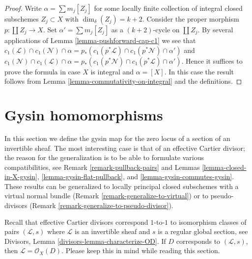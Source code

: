 \begin{proof}
Write $\alpha = \sum m_j[Z_j]$ for some locally finite
collection of integral closed subschemes $Z_j \subset X$
with $\dim_\delta(Z_j) = k + 2$.
Consider the proper morphism $p : \coprod Z_j \to X$.
Set $\alpha' = \sum m_j[Z_j]$ as a $(k + 2)$-cycle on
$\coprod Z_j$. By several applications of
Lemma \ref{lemma-pushforward-cap-c1} we see that
$c_1(\mathcal{L}) \cap c_1(\mathcal{N}) \cap \alpha
= p_*(c_1(p^*\mathcal{L}) \cap c_1(p^*\mathcal{N}) \cap \alpha')$
and
$c_1(\mathcal{N}) \cap c_1(\mathcal{L}) \cap \alpha
= p_*(c_1(p^*\mathcal{N}) \cap c_1(p^*\mathcal{L}) \cap \alpha')$.
Hence it suffices to prove the formula in case $X$ is integral
and $\alpha = [X]$. In this case the result follows
from Lemma \ref{lemma-commutativity-on-integral} and the definitions.
\end{proof}






\section{Gysin homomorphisms}
\label{section-intersecting-effective-Cartier}

\noindent
In this section we define the gysin map for the zero locus of a
section of an invertible sheaf. The most interesting case is that
of an effective Cartier divisor; the reason for the generalization
is to be able to formulate various compatibilities, see
Remark \ref{remark-pullback-pairs} and
Lemmas \ref{lemma-closed-in-X-gysin},
\ref{lemma-gysin-flat-pullback}, and
\ref{lemma-gysin-commutes-gysin}.
These results can be generalized to locally principal
closed subschemes with a virtual normal bundle
(Remark \ref{remark-generalize-to-virtual}) or to
pseudo-divisors (Remark \ref{remark-generalize-to-pseudo-divisor}).

\medskip\noindent
Recall that effective Cartier divisors correspond $1$-to-$1$ to
isomorphism classes of pairs $(\mathcal{L}, s)$ where $\mathcal{L}$
is an invertible sheaf and $s$ is a regular global section, see
Divisors, Lemma \ref{divisors-lemma-characterize-OD}.
If $D$ corresponds to $(\mathcal{L}, s)$, then
$\mathcal{L} = \mathcal{O}_X(D)$. Please keep this in mind while
reading this section.

